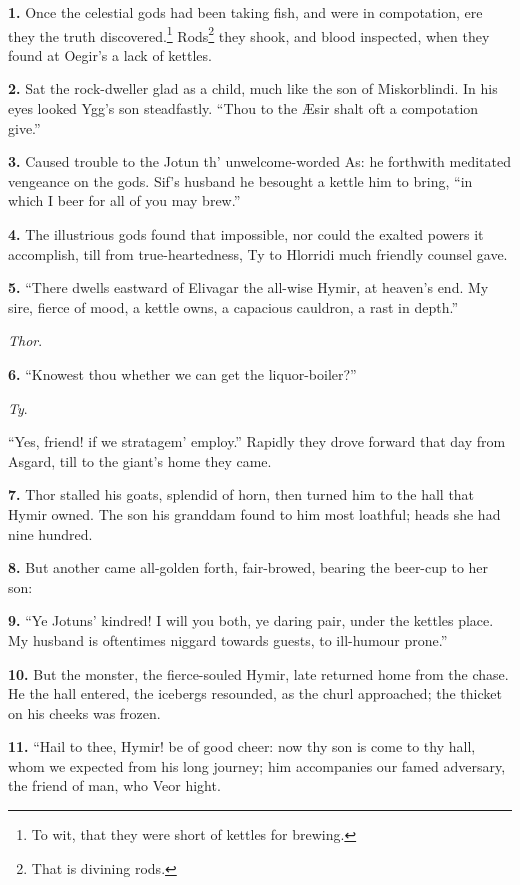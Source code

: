 
\textbf{1.} Once the celestial gods had been taking fish, and were in
compotation, ere they the truth discovered.\footnote{To wit, that they were short of kettles for brewing.} Rods\footnote{That is divining rods.} they shook,
and blood inspected, when they found at Oegir's a lack of kettles.

\textbf{2.} Sat the rock-dweller glad as a child, much like the son of
Miskorblindi. In his eyes looked Ygg's son steadfastly. ``Thou to the
Æsir shalt oft a compotation give.''

\textbf{3.} Caused trouble to the Jotun th' unwelcome-worded As: he forthwith
meditated vengeance on the gods. Sif's husband he besought a kettle
him to bring, ``in which I beer for all of you may brew.''

\textbf{4.} The illustrious gods found that impossible, nor could the exalted
powers it accomplish, till from true-heartedness, Ty to Hlorridi much
friendly counsel gave.

\textbf{5.} ``There dwells eastward of Elivagar the all-wise Hymir, at
heaven's end. My sire, fierce of mood, a kettle owns, a capacious
cauldron, a rast in depth.''

\emph{Thor}.

\textbf{6.} ``Knowest thou whether we can get the liquor-boiler?''

\emph{Ty}.

``Yes, friend! if we stratagem' employ.'' Rapidly they drove forward
that day from Asgard, till to the giant's home they came.

\textbf{7.} Thor stalled his goats, splendid of horn, then turned him to the
hall that Hymir owned. The son his granddam found to him most
loathful; heads she had nine hundred.

\textbf{8.} But another came all-golden forth, fair-browed, bearing the
beer-cup to her son:

\textbf{9.} ``Ye Jotuns' kindred! I will you both, ye daring pair, under the
kettles place. My husband is oftentimes niggard towards guests, to
ill-humour prone.''

\textbf{10.} But the monster, the fierce-souled Hymir, late returned home
from the chase. He the hall entered, the icebergs resounded, as the
churl approached; the thicket on his cheeks was frozen.

\textbf{11.} ``Hail to thee, Hymir! be of good cheer: now thy son is come to
thy hall, whom we expected from his long journey; him accompanies our
famed adversary, the friend of man, who Veor hight.

